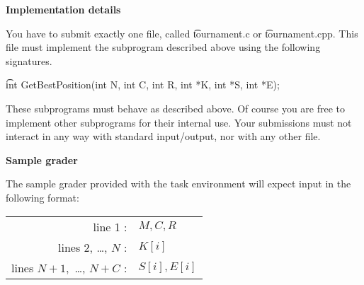 \bf{Implementation details}

You have to submit exactly one file, called \t{tournament.c} or \t{tournament.cpp}. This file must implement the subprogram described above using the following signatures. 

\t{int GetBestPosition(int N, int C, int R, int *K, int *S, int *E);}

These subprograms must behave as described above. Of course you are free to implement other subprograms for their internal use. Your submissions must not interact in any way with standard input/output, nor with any other file. 

\bf{Sample grader} 

The sample grader provided with the task environment will expect input in the following format: 

\begin{tabular}{rl}
line 1 :& $M, C, R$\\
lines 2, \dots, $N$ :& $K[i]$\\
lines $N + 1,$ \dots, $N + C$ :& $S[i], E[i]$\\
\end{tabular}
